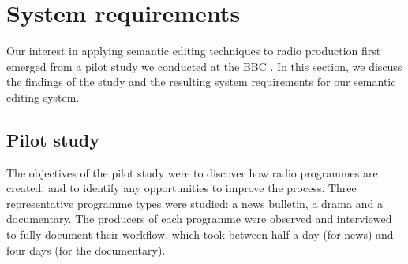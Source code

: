 









\section{System requirements}\label{sec:screen-requirements}
Our interest in applying semantic editing techniques to radio production first emerged from a pilot study we conducted
at the BBC \citep{Baume2015}.  In this section, we discuss the findings of the study and the resulting system
requirements for our semantic editing system.

\subsection{Pilot study}
The objectives of the pilot study were to discover how radio programmes are created, and to identify any opportunities
to improve the process.  Three representative programme types were studied: a news bulletin, a drama and a documentary.
The producers of each programme were observed and interviewed to fully document their workflow, which took between half
a day (for news) and four days (for the documentary).

